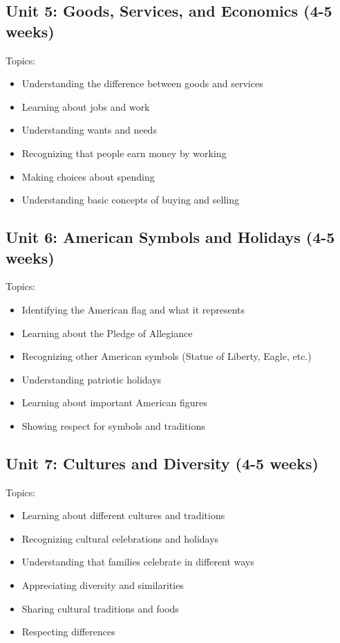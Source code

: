 \documentclass[11pt,letterpaper]{report}
\begin{document}
\subsection{Unit 5: Goods, Services, and Economics (4-5 weeks)}

Topics:
\begin{itemize}
\item Understanding the difference between goods and services
\item Learning about jobs and work
\item Understanding wants and needs
\item Recognizing that people earn money by working
\item Making choices about spending
\item Understanding basic concepts of buying and selling
\end{itemize}

\subsection{Unit 6: American Symbols and Holidays (4-5 weeks)}

Topics:
\begin{itemize}
\item Identifying the American flag and what it represents
\item Learning about the Pledge of Allegiance
\item Recognizing other American symbols (Statue of Liberty, Eagle, etc.)
\item Understanding patriotic holidays
\item Learning about important American figures
\item Showing respect for symbols and traditions
\end{itemize}

\subsection{Unit 7: Cultures and Diversity (4-5 weeks)}

Topics:
\begin{itemize}
\item Learning about different cultures and traditions
\item Recognizing cultural celebrations and holidays
\item Understanding that families celebrate in different ways
\item Appreciating diversity and similarities
\item Sharing cultural traditions and foods
\item Respecting differences
\end{itemize}
\end{document}
